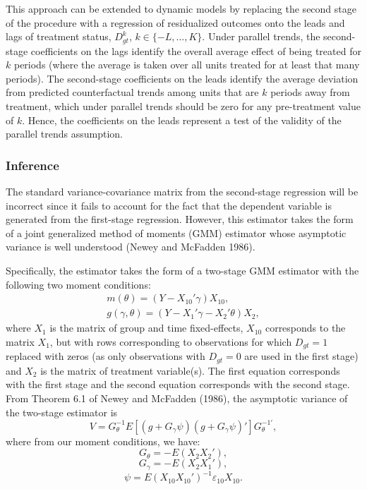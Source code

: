 This approach can be extended to dynamic models by replacing the second stage of the procedure with a regression of residualized outcomes onto the leads and lags of treatment status, \(D_{gt}^k\), \(k \in \{-L, \dots, K\}\). Under parallel trends, the second-stage coefficients on the lags identify the overall average effect of being treated for \(k\) periods (where the average is taken over all units treated for at least that many periods). The second-stage coefficients on the leads identify the average deviation from predicted counterfactual trends among units that are \(k\) periods away from treatment, which under parallel trends should be zero for any pre-treatment value of \(k\). Hence, the coefficients on the leads represent a test of the validity of the parallel trends assumption.

\hypertarget{inference}{%
\subsubsection{Inference}\label{inference}}

The standard variance-covariance matrix from the second-stage regression will be incorrect since it fails to account for the fact that the dependent variable is generated from the first-stage regression. However, this estimator takes the form of a joint generalized method of moments (GMM) estimator whose asymptotic variance is well understood (Newey and McFadden 1986).

Specifically, the estimator takes the form of a two-stage GMM estimator with the following two moment conditions:
\begin{align}
  m(\theta) = (Y-X_{10}'\gamma)X_{10}, \\
  g(\gamma, \theta) = (Y - X_1'\gamma - X_2'\theta) X_2,
\end{align}
where \(X_1\) is the matrix of group and time fixed-effects, \(X_{10}\) corresponds to the matrix \(X_1\), but with rows corresponding to observations for which \(D_{gt} = 1\) replaced with zeros (as only observations with \(D_{gt} = 0\) are used in the first stage) and \(X_2\) is the matrix of treatment variable(s). The first equation corresponds with the first stage and the second equation corresponds with the second stage. From Theorem 6.1 of Newey and McFadden (1986), the asymptotic variance of the two-stage estimator is
\begin{equation}
  V = G_\theta^{-1} E\left[ (g + G_\gamma \psi)(g + G_\gamma \psi)' \right] G_\theta^{-1'},
\end{equation}
where from our moment conditions, we have:
\[
  G_\theta = - E\left(X_2X_2' \right),
\]
\[
  G_\gamma = - E\left(X_2X_1'\right),
\]
\[
  \psi = E(X_{10}X_{10}')^{-1} \varepsilon_{10} X_{10}.
\]

